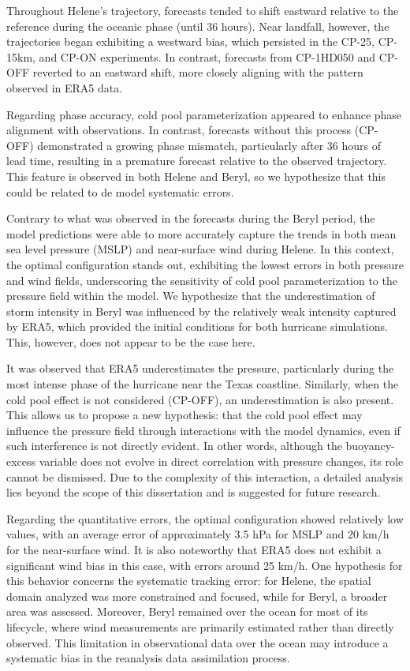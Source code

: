 Throughout Helene’s trajectory, forecasts tended to shift eastward relative to the reference during the oceanic phase (until 36 hours). Near landfall, however, the trajectories began exhibiting a westward bias, which persisted in the CP-25, CP-15km, and CP-ON experiments. In contrast, forecasts from CP-1HD050 and CP-OFF reverted to an eastward shift, more closely aligning with the pattern observed in ERA5 data.

Regarding phase accuracy, cold pool parameterization appeared to enhance phase alignment with observations. In contrast, forecasts without this process (CP-OFF) demonstrated a growing phase mismatch, particularly after 36 hours of lead time, resulting in a premature forecast relative to the observed trajectory. This feature is observed in both Helene and Beryl, so we hypothesize that this could be related to de model systematic errors.

Contrary to what was observed in the forecasts during the Beryl period, the model predictions were able to more accurately capture the trends in both mean sea level pressure (MSLP) and near-surface wind during Helene. In this context, the optimal configuration stands out, exhibiting the lowest errors in both pressure and wind fields, underscoring the sensitivity of cold pool parameterization to the pressure field within the model. We hypothesize that the underestimation of storm intensity in Beryl was influenced by the relatively weak intensity captured by ERA5, which provided the initial conditions for both hurricane simulations. This, however, does not appear to be the case here.

It was observed that ERA5 underestimates the pressure, particularly during the most intense phase of the hurricane near the Texas coastline. Similarly, when the cold pool effect is not considered (CP-OFF), an underestimation is also present. This allows us to propose a new hypothesis: that the cold pool effect may influence the pressure field through interactions with the model dynamics, even if such interference is not directly evident. In other words, although the buoyancy-excess variable does not evolve in direct correlation with pressure changes, its role cannot be dismissed. Due to the complexity of this interaction, a detailed analysis lies beyond the scope of this dissertation and is suggested for future research.

Regarding the quantitative errors, the optimal configuration showed relatively low values, with an average error of approximately 3.5 hPa for MSLP and 20 km/h for the near-surface wind. It is also noteworthy that ERA5 does not exhibit a significant wind bias in this case, with errors around 25 km/h. One hypothesis for this behavior concerns the systematic tracking error: for Helene, the spatial domain analyzed was more constrained and focused, while for Beryl, a broader area was assessed. Moreover, Beryl remained over the ocean for most of its lifecycle, where wind measurements are primarily estimated rather than directly observed. This limitation in observational data over the ocean may introduce a systematic bias in the reanalysis data assimilation process.

